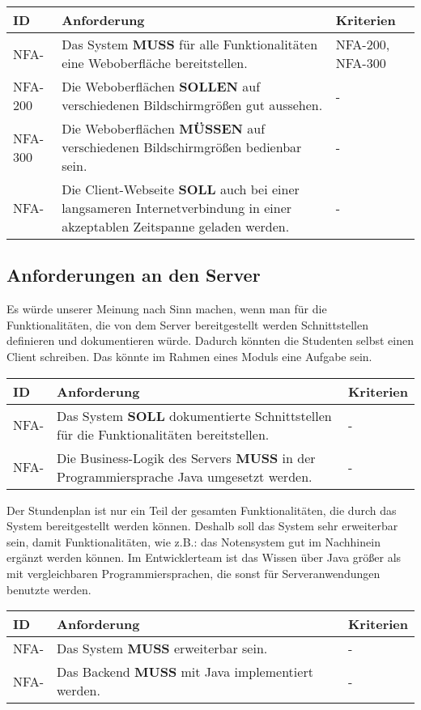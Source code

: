 \vspace{12pt}

\begin{tabular} {|p{}|p{11cm}|p{}|}
	\hline
	ID & Anforderung & Kriterien \\
	\hline
	NFA-
	& Das System \textbf{MUSS} für alle Funktionalitäten eine Weboberfläche bereitstellen. 
	& NFA-200, NFA-300 \\
	\hline
	NFA-200 
	& Die Weboberflächen \textbf{SOLLEN} auf verschiedenen Bildschirmgrößen gut aussehen.
	& -  \\
	\hline
	NFA-300
	& Die Weboberflächen \textbf{MÜSSEN} auf verschiedenen Bildschirmgrößen bedienbar sein.
	& - \\
	\hline
	NFA-
	& Die Client-Webseite \textbf{SOLL} auch bei einer langsameren Internetverbindung in einer akzeptablen Zeitspanne geladen werden.
	& - \\
	\hline
\end{tabular}

\newpage

\subsection{Anforderungen an den Server}
Es würde unserer Meinung nach Sinn machen, wenn man für die Funktionalitäten, die von dem Server bereitgestellt werden Schnittstellen definieren und dokumentieren würde. Dadurch könnten die Studenten selbst einen Client schreiben. Das könnte im Rahmen eines Moduls eine Aufgabe sein. 

\vspace{12pt}

\begin{tabular} {|p{}|p{11cm}|p{}|}
	\hline
	ID & Anforderung & Kriterien \\
	\hline
	NFA- 
	& Das System \textbf{SOLL} dokumentierte Schnittstellen für die Funktionalitäten bereitstellen.
	& - \\
	\hline
	NFA- 
	& Die Business-Logik des Servers \textbf{MUSS} in der Programmiersprache Java umgesetzt werden.
	& - \\
	\hline
\end{tabular}

\vspace{12pt}

Der Stundenplan ist nur ein Teil der gesamten Funktionalitäten, die durch das System bereitgestellt werden können. Deshalb soll das System sehr erweiterbar sein, damit Funktionalitäten, wie z.B.: das Notensystem gut im Nachhinein ergänzt werden können. Im Entwicklerteam ist das Wissen über Java größer als mit vergleichbaren Programmiersprachen, die sonst für Serveranwendungen benutzte werden.

\vspace{12pt}

\begin{tabular} {|p{}|p{11cm}|p{}|}
	\hline
	ID & Anforderung & Kriterien \\
	\hline
	NFA- 
	& Das System \textbf{MUSS} erweiterbar sein.
	& - \\
	\hline
	NFA- 
	& Das Backend \textbf{MUSS} mit Java implementiert werden.
	& - \\
	\hline
\end{tabular}